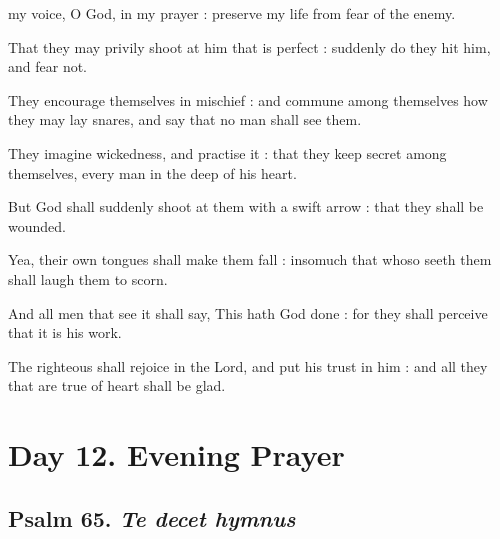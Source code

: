  my voice, O God, in my prayer : preserve my life from fear of the enemy.\par
{}
That they may privily shoot at him that is perfect : suddenly do they hit him, and fear not.\par
{}They encourage themselves in mischief : and commune among themselves how they may lay snares, and say that no man shall see them.\par
{}They imagine wickedness, and practise it : that they keep secret among themselves, every man in the deep of his heart.\par
{}But God shall suddenly shoot at them with a swift arrow : that they shall be wounded.\par
{}Yea, their own tongues shall make them fall : insomuch that whoso seeth them shall laugh them to scorn.\par
{}And all men that see it shall say, This hath God done : for they shall perceive that it is his work.\par
{}The righteous shall rejoice in the Lord, and put his trust in him : and all they that are true of heart shall be glad.\par

\section*{Day 12. Evening Prayer}

\subsection{Psalm 65. \textit{Te decet hymnus}}

